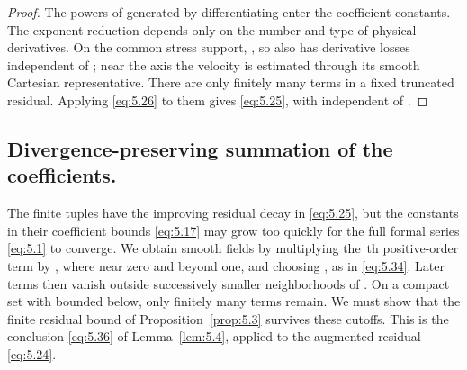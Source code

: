 \begin{proof}
The powers of  generated by differentiating
 enter the coefficient constants. The exponent reduction depends
only on the number and type of physical derivatives. On the common stress support,
, so
 also has derivative losses independent of
; near the axis the velocity is estimated through its smooth Cartesian
representative. There are only finitely many terms in a fixed truncated residual. Applying
\eqref{eq:5.26} to them gives \eqref{eq:5.25}, with
 independent of .
\end{proof}

\subsection{Divergence-preserving summation of the coefficients.}\label{sec:5.4}
The finite tuples  have the improving residual decay in
\eqref{eq:5.25}, but the constants  in their coefficient bounds
\eqref{eq:5.17} may grow too quickly for the full formal series \eqref{eq:5.1} to converge. We
obtain smooth fields by multiplying the \,th positive-order term by
, where  near zero and
 beyond one, and choosing , as in
\eqref{eq:5.34}. Later terms then vanish outside successively smaller neighborhoods of
. On a compact set with  bounded below, only
finitely many terms remain. We must show that the finite residual bound of Proposition~\ref{prop:5.3}
survives these cutoffs. This is the conclusion \eqref{eq:5.36} of Lemma~\ref{lem:5.4}, applied to the
augmented residual \eqref{eq:5.24}.

